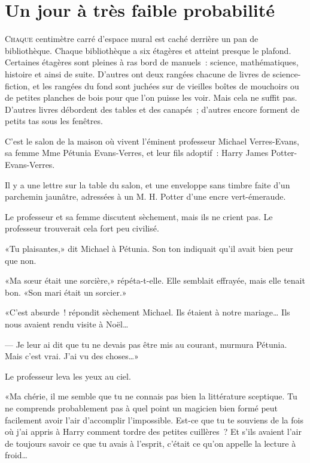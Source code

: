 \chapter{Un jour à très faible probabilité}

\lettrine{C}{haque} centimètre carré d'espace mural est caché derrière un pan de bibliothèque. Chaque bibliothèque a six étagères et atteint presque le
plafond. Certaines étagères sont pleines à ras bord de manuels~: science, mathématiques, histoire et ainsi de suite. D'autres ont deux rangées chacune de livres de science-fiction, et les rangées du fond sont juchées sur de vieilles boîtes de mouchoirs\footnotemark{} ou de petites planches de bois pour que l'on puisse les voir. Mais cela ne suffit pas. D'autres livres débordent des tables et des canapés~; d'autres encore forment de petits tas sous les fenêtres.

C'est le salon de la maison où vivent l'éminent professeur Michael Verres-Evans, sa femme Mme Pétunia Evans-Verres, et leur fils adoptif~: Harry James Potter-Evans-Verres.

Il y a une lettre sur la table du salon, et une enveloppe sans timbre faite d'un parchemin jaunâtre, adressées à un M. H. Potter d'une encre vert-émeraude.

Le professeur et sa femme discutent sèchement, mais ils ne crient pas. Le professeur trouverait cela fort peu civilisé.

«Tu plaisantes,» dit Michael à Pétunia. Son ton indiquait qu'il avait bien peur que non.

«Ma sœur était une sorcière,» répéta-t-elle. Elle semblait effrayée, mais elle tenait bon. «Son mari était un sorcier.»

«C'est absurde~! répondit sèchement Michael. Ils étaient à notre mariage… Ils nous avaient rendu visite à Noël…

--- Je leur ai dit que tu ne devais pas être mis au courant, murmura Pétunia. Mais c'est vrai. J'ai vu des choses…»

Le professeur leva les yeux au ciel.

«Ma chérie, il me semble que tu ne connais pas bien la littérature sceptique. Tu ne comprends probablement pas à quel point un magicien bien formé peut facilement avoir l'air d'accomplir l'impossible. Est-ce que tu te souviens de la fois où j'ai appris à Harry comment tordre des petites cuillères~? Et s'ils avaient l'air de toujours savoir ce que tu avais à l'esprit, c'était ce qu'on appelle la lecture à froid…

